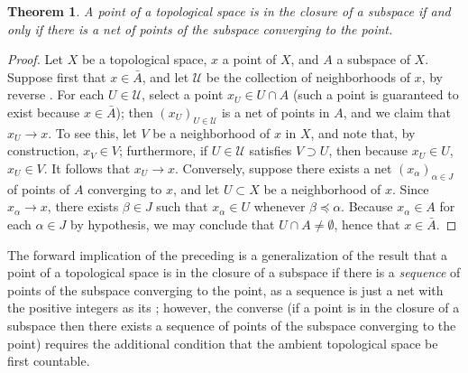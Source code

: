\documentclass[12pt]{article}
\theoremstyle{plain}
\newtheorem*{theorem*}{Theorem}
\begin{document}
\begin{theorem*}
A point of a topological space is in the closure of a subspace if and only if there is a net of points of the subspace converging to the point.
\end{theorem*}
\begin{proof}
Let $X$ be a topological space, $x$ a point of $X$, and $A$ a subspace of $X$.
Suppose first that $x\in\bar{A}$, and let $\mathcal{U}$ be the collection of neighborhoods of $x$,  by reverse . For each $U\in\mathcal{U}$, select a point $x_U\in U\cap A$ (such a point is guaranteed to exist because $x\in\bar{A}$); then $(x_U)_{U\in\mathcal{U}}$ is a net of points in $A$, and we claim that $x_U\rightarrow x$. To see this, let $V$ be a neighborhood of $x$ in $X$, and note that, by construction, $x_V\in V$; furthermore, if $U\in\mathcal{U}$ satisfies $V\supset U$, then because $x_U\in U$, $x_U\in V$. It follows that $x_U\rightarrow x$.
Conversely, suppose there exists a net $(x_\alpha)_{\alpha\in J}$ of points of $A$ converging to $x$, and let $U\subset X$ be a neighborhood of $x$. Since $x_\alpha\rightarrow x$, there exists $\beta\in J$ such that $x_\alpha\in U$ whenever $\beta\preceq\alpha$. Because $x_\alpha\in A$ for each $\alpha\in J$ by hypothesis, we may conclude that $U\cap A\neq\emptyset$, hence that $x\in\bar{A}$.
\end{proof}
The forward implication of the preceding  is a generalization of the result that a point of a topological space is in the closure of a subspace if there is a \emph{sequence} of points of the subspace converging to the point, as a sequence is just a net with the positive integers as its ; however, the converse (if a point is in the closure of a subspace then there exists a sequence of points of the subspace converging to the point) requires the additional condition that the ambient topological space be first countable. 
\end{document}
